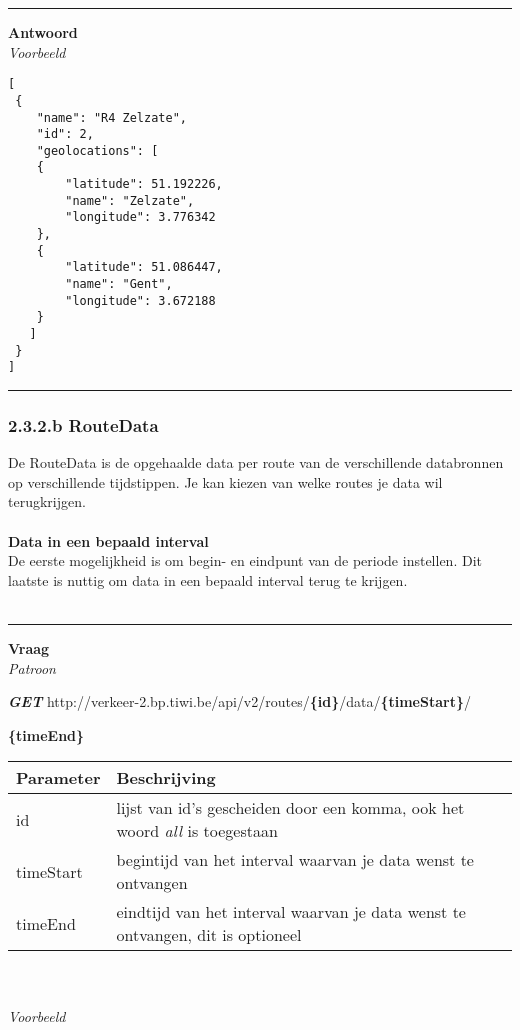 \documentclass[ps,a4paper,oneside]{report}
\begin{document}
\noindent\rule[0.5ex]{\linewidth}{1pt}
\textbf{Antwoord}\\
\textit{Voorbeeld}
\begin{verbatim}[
 {
    "name": "R4 Zelzate",
    "id": 2,
    "geolocations": [
    {
        "latitude": 51.192226,
        "name": "Zelzate",
        "longitude": 3.776342
    },
    {
        "latitude": 51.086447,
        "name": "Gent",
        "longitude": 3.672188
    }
   ]
 }
]\end{verbatim}
\noindent\rule[0.5ex]{\linewidth}{1pt}
\subsubsection{2.3.2.b RouteData}
De RouteData is de opgehaalde data per route van de verschillende databronnen op verschillende tijdstippen. Je kan kiezen van welke routes je data wil terugkrijgen.\\\\
\textbf{Data in een bepaald interval}\\
De eerste mogelijkheid is om begin- en eindpunt van de periode instellen. Dit laatste is nuttig om data in een bepaald interval terug te krijgen.\\\\ 

\clearpage
\noindent\rule[0.5ex]{\linewidth}{1pt}
\textbf{Vraag}\\

\textit{Patroon}

\textbf{\textit{GET}}
 http://verkeer-2.bp.tiwi.be/api/v2/routes/\textbf{\{id\}}/data/\textbf{\{timeStart\}}/
 
 \textbf{\{timeEnd\}}\\
 
 \begin{tabular}{ | l | p{8.5 cm}| }
 	\hline
 	\textbf{Parameter} & \textbf{Beschrijving}\\
 	\hline
 	id & lijst van id's gescheiden door een komma, ook het woord \textit{all} is toegestaan\\
 	\hline
 	timeStart & begintijd van het interval waarvan je data wenst te ontvangen\\
 	\hline
 	timeEnd & eindtijd van het interval waarvan je data wenst te ontvangen, dit is optioneel\\
 	\hline
 \end{tabular}\\\\
 
\textit{Voorbeeld}
\end{document}
